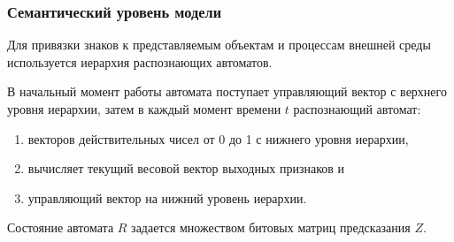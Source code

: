 \documentclass[default]{beamer}
\begin{document}
	\begin{frame}
		\frametitle{Семантический уровень модели}
		
		Для привязки знаков к представляемым объектам  и процессам внешней среды используется иерархия распознающих автоматов. 
		\par\bigskip
		В начальный момент работы автомата поступает управляющий вектор с верхнего уровня иерархии, затем в каждый момент времени $t$ распознающий автомат:
		\begin{enumerate}
			\item векторов действительных чисел от 0 до 1 с нижнего уровня иерархии,
			\item вычисляет текущий весовой вектор выходных признаков и
			\item управляющий вектор на нижний уровень иерархии.
		\end{enumerate}
		
		Состояние автомата $R$ задается множеством битовых матриц предсказания $Z$.
	\end{frame}
	
\end{document}
